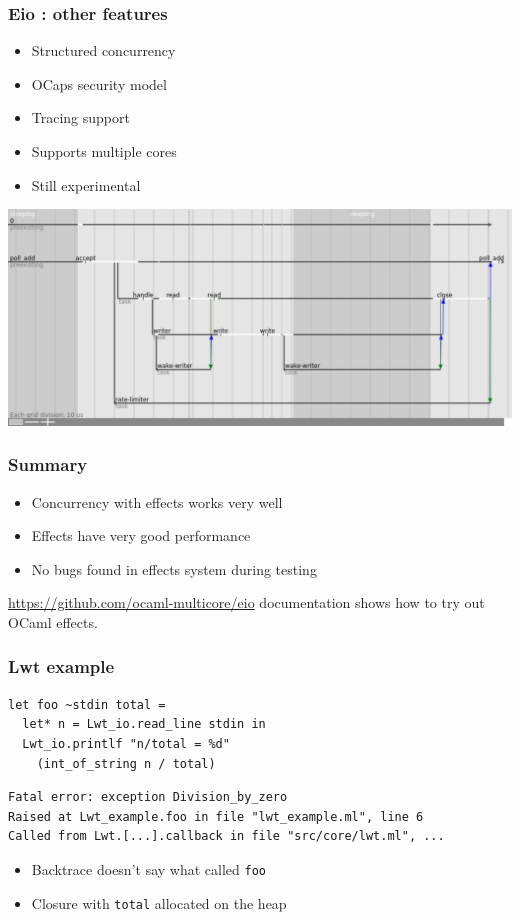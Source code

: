 \documentclass{beamer}
\begin{document}
\begin{frame}
	\frametitle{Eio : other features}
	\begin{itemize}
		\item Structured concurrency
		\item OCaps security model
		\item Tracing support
		\item Supports multiple cores
		\item Still experimental
	\end{itemize}
	\includegraphics[width=\textwidth]{trace.png}
\end{frame}

\begin{frame}
	\frametitle{Summary}
	\begin{itemize}
		\item Concurrency with effects works very well
		\item Effects have very good performance
		\item No bugs found in effects system during testing
	\end{itemize}
	\bigskip
	\url{https://github.com/ocaml-multicore/eio} documentation shows how to try out OCaml effects.
\end{frame}


\begin{frame}[fragile]
	\frametitle{Lwt example}
\begin{lstlisting}[style=ocaml]
let foo ~stdin total =
  let* n = Lwt_io.read_line stdin in
  Lwt_io.printlf "n/total = %d"
    (int_of_string n / total)
\end{lstlisting}
\begin{lstlisting}[style=output]
Fatal error: exception Division_by_zero
Raised at Lwt_example.foo in file "lwt_example.ml", line 6
Called from Lwt.[...].callback in file "src/core/lwt.ml", ...
\end{lstlisting}
	\begin{itemize}
		\item Backtrace doesn't say what called \verb|foo|
		\item Closure with \verb|total| allocated on the heap
	\end{itemize}
\end{frame}
\end{document}
